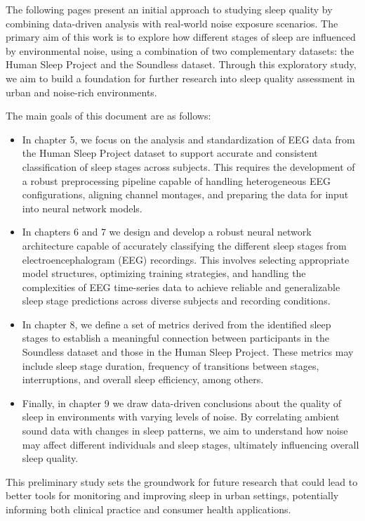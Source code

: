 The following pages present an initial approach to studying sleep quality by combining data-driven analysis with real-world noise exposure scenarios. The primary aim of this work is to explore how different stages of sleep are influenced by environmental noise, using a combination of two complementary datasets: the Human Sleep Project and the Soundless dataset. Through this exploratory study, we aim to build a foundation for further research into sleep quality assessment in urban and noise-rich environments.

The main goals of this document are as follows:

\begin{itemize}
  \item In chapter 5, we focus on the analysis and standardization of EEG data from the Human Sleep Project dataset to support accurate and consistent classification of sleep stages across subjects. This requires the development of a robust preprocessing pipeline capable of handling heterogeneous EEG configurations, aligning channel montages, and preparing the data for input into neural network models.
  \item In chapters 6 and 7 we design and develop a robust neural network architecture capable of accurately classifying the different sleep stages from electroencephalogram (EEG) recordings. This involves selecting appropriate model structures, optimizing training strategies, and handling the complexities of EEG time-series data to achieve reliable and generalizable sleep stage predictions across diverse subjects and recording conditions.
  \item In chapter 8, we define a set of metrics derived from the identified sleep stages to establish a meaningful connection between participants in the Soundless dataset and those in the Human Sleep Project. These metrics may include sleep stage duration, frequency of transitions between stages, interruptions, and overall sleep efficiency, among others. 
  \item Finally, in chapter 9 we draw data-driven conclusions about the quality of sleep in environments with varying levels of noise. By correlating ambient sound data with changes in sleep patterns, we aim to understand how noise may affect different individuals and sleep stages, ultimately influencing overall sleep quality.  
\end{itemize}

This preliminary study sets the groundwork for future research that could lead to better tools for monitoring and improving sleep in urban settings, potentially informing both clinical practice and consumer health applications.

